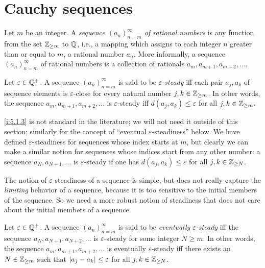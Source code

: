 \section{Cauchy sequences}\label{i:sec:5.1}

\begin{defn}[Sequences]\label{i:5.1.1}
  Let \(m\) be an integer.
  A \emph{sequence \((a_n)_{n = m}^{\infty}\) of rational numbers} is any function from the set \(\mathbb{Z}_{\geq m}\) to \(\mathbb{Q}\), i.e., a mapping which assigns to each integer \(n\) greater than or equal to \(m\), a rational number \(a_n\).
  More informally, a sequence \((a_n)_{n = m}^{\infty}\) of rational numbers is a collection of rationals \(a_m, a_{m + 1}, a_{m + 2}, \dots\).
\end{defn}

\setcounter{thm}{2}
\begin{defn}\label{i:5.1.3}
  Let \(\varepsilon \in \mathbb{Q}^+\).
  A sequence \((a_n)_{n = m}^{\infty}\) is said to be \emph{\(\varepsilon\)-steady} iff each pair \(a_j, a_k\) of sequence elements is \(\varepsilon\)-close for every natural number \(j, k \in \mathbb{Z}_{\geq m}\).
  In other words, the sequence \(a_m, a_{m + 1}, a_{m + 2}, \dots\) is \(\varepsilon\)-steady iff \(d(a_j, a_k) \leq \varepsilon\) for all \(j, k \in \mathbb{Z}_{\geq m}\).
\end{defn}

\begin{rmk}\label{i:5.1.4}
  \cref{i:5.1.3} is not standard in the literature;
  we will not need it outside of this section;
  similarly for the concept of ``eventual \(\varepsilon\)-steadiness'' below.
  We have defined \(\varepsilon\)-steadiness for sequences whose index starts at \(m\), but clearly we can make a similar notion for sequences whose indices start from any other number:
  a sequence \(a_N, a_{N + 1}, \dots\) is \(\varepsilon\)-steady if one has \(d(a_j, a_k) \leq \varepsilon\) for all \(j, k \in \mathbb{Z}_{\geq N}\).
\end{rmk}

\begin{note}
  The notion of \(\varepsilon\)-steadiness of a sequence is simple, but does not really capture the \emph{limiting} behavior of a sequence, because it is too sensitive to the initial members of the sequence.
  So we need a more robust notion of steadiness that does not care about the initial members of a sequence.
\end{note}

\setcounter{thm}{5}
\begin{defn}\label{i:5.1.6}
  Let \(\varepsilon \in \mathbb{Q}^+\).
  A sequence \((a_n)_{n = m}^{\infty}\) is said to be \emph{eventually \(\varepsilon\)-steady} iff the sequence \(a_N, a_{N + 1}, a_{N + 2}, \dots\) is \(\varepsilon\)-steady for some integer \(N \geq m\).
  In other words, the sequence \(a_m, a_{m + 1}, a_{m + 2}, \dots\) is eventually \(\varepsilon\)-steady iff there exists an \(N \in \mathbb{Z}_{\geq m}\) such that \(\left\lvert a_j - a_k\right\rvert \leq \varepsilon\) for all \(j, k \in \mathbb{Z}_{\geq N}\).
\end{defn}


